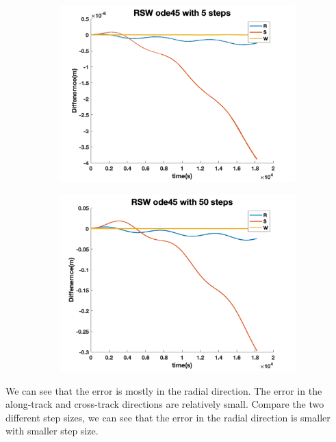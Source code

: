 \documentclass[12pt
,headinclude
,headsepline
,bibtotocnumbered
]{scrartcl}
\begin{document}
\begin{figure}[H]
\begin{subfigure}[b]{0.45\textwidth}
    \includegraphics[width=1\textwidth]{./plots/ode45_5_yprime_RSW.png}
    \end{subfigure}
    \begin{subfigure}[b]{0.45\textwidth}
    \includegraphics[width=1\textwidth]{./plots/ode45_50_yprime_RSW.png}
    \end{subfigure}
    \end{figure}
    We can see that the error is mostly in the radial direction. The error in the along-track and cross-track directions are relatively small. Compare the two different step sizes, we can see that the error in the radial direction is smaller with smaller step size. 
\end{document}
